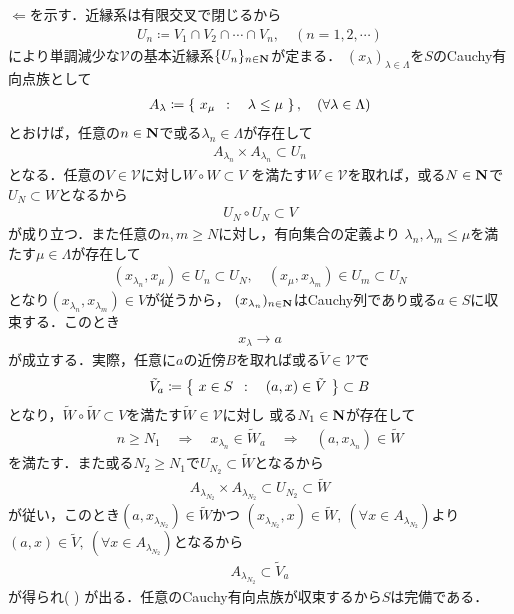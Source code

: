 	\begin{prf}
		$\Longleftarrow$を示す．近縁系は有限交叉で閉じるから
		\begin{align}
			U_n \coloneqq V_1 \cap V_2 \cap \cdots \cap V_n,
			\quad (n = 1,2,\cdots)
		\end{align}
		により単調減少な$\mathscr{V}$の基本近縁系$\{U_n\}_{n \in \mathbf{N}}$が定まる．
		$(x_\lambda)_{\lambda \in \Lambda}$を$S$のCauchy有向点族として
		\begin{align}
			A_\lambda \coloneqq \left\{\ x_\mu\ \, : \quad \lambda \leq \mu\ \right\},
			\quad (\forall \lambda \in \Lambda)
		\end{align}
		とおけば，任意の$n \in \mathbf{N}$で或る$\lambda_n \in \Lambda$が存在して
		\begin{align}
			A_{\lambda_n} \times A_{\lambda_n} \subset U_n
		\end{align}
		となる．任意の$V \in \mathscr{V}$に対し$W \circ W \subset V$
		を満たす$W \in \mathscr{V}$を取れば，或る$N \in \mathbf{N}$で$U_N \subset W$となるから
		\begin{align}
			U_N \circ U_N \subset V
		\end{align}
		が成り立つ．また任意の$n,m \geq N$に対し，有向集合の定義より
		$\lambda_n,\lambda_m \leq \mu$を満たす$\mu \in \Lambda$が存在して
		\begin{align}
			(x_{\lambda_n},x_\mu) \in U_n \subset U_N,
			\quad (x_\mu, x_{\lambda_m}) \in U_m \subset U_N
		\end{align}
		となり$(x_{\lambda_n},x_{\lambda_m}) \in V$が従うから，
		$(x_{\lambda_n})_{n \in \mathbf{N}}$はCauchy列であり或る$a \in S$に収束する．このとき
		\begin{align}
			x_\lambda \longrightarrow a
			\label{eq:thm_complete_iff_every_Cauchy_seq_converges_if_entourage_contains_some_countable_subset}
		\end{align}
		が成立する．実際，任意に$a$の近傍$B$を取れば或る$\tilde{V} \in \mathscr{V}$で
		\begin{align}
			\tilde{V}_a \coloneqq \left\{\ x \in S\ \, : \quad (a,x) \in \tilde{V}\ \right\} \subset B
		\end{align}
		となり，$\tilde{W} \circ \tilde{W} \subset V$を満たす$\tilde{W} \in \mathscr{V}$に対し
		或る$N_1 \in \mathbf{N}$が存在して
		\begin{align}
			n \geq N_1 \quad \Longrightarrow \quad
			x_{\lambda_n} \in \tilde{W}_a \quad \Longrightarrow \quad
			(a,x_{\lambda_n}) \in \tilde{W}
		\end{align}
		を満たす．また或る$N_2 \geq N_1$で$U_{N_2} \subset \tilde{W}$となるから
		\begin{align}
			A_{\lambda_{N_2}} \times A_{\lambda_{N_2}} \subset U_{N_2} \subset \tilde{W}
		\end{align}
		が従い，このとき$(a,x_{\lambda_{N_2}}) \in \tilde{W}$かつ
		$(x_{\lambda_{N_2}},x) \in \tilde{W},\ (\forall x \in A_{\lambda_{N_2}})$より
		$(a,x) \in \tilde{V},\ (\forall x \in A_{\lambda_{N_2}})$となるから
		\begin{align}
			A_{\lambda_{N_2}} \subset \tilde{V}_a 
		\end{align}
		が得られ(
		)
		が出る．任意のCauchy有向点族が収束するから$S$は完備である．
		\QED
	\end{prf}
	
